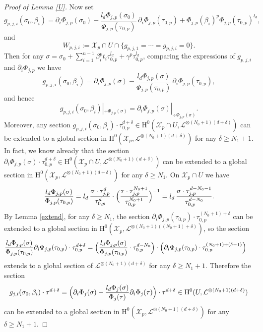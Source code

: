 \documentclass[JEP,XML,SOM,Unicode,published]{cedram}
\theoremstyle{plain}
\theoremstyle{definition}
\newcommand{\ho}{\mathrm{H}}
\newcommand{\X}{\mathcal{X}}
\newcommand{\li}{\mathcal{L}}
\begin{document}
\begin{proof}[Proof of Lemma \ref{U}]
Now set\vspace*{-3pt}
\[
g_{p, j,i}(\sigma_0,\beta_i)=\partial_i \Phi_{j,p}(\sigma_0)-\frac{l_d\Phi_{j,p}(\sigma_0)}{\Phi_{j,p}(\tau_{0,p})}\, \partial_i\Phi_{j,p}(\tau_{0,p})+\Phi_{j,p}(\beta_i)^p\Phi_{j,p}(\tau_{0,p})^{l_d},
\]
and\vspace*{-3pt}
\[
W_{p,j,i}:=\X_p\cap U\cap \{ g_{p,j,1}=\cdots=g_{p,j,i}=0 \}.
\]
Then for any $\sigma=\sigma_0+\sum_{i=1}^{n-1} \beta_i^pt_i\tau_{0,p}^{l_d}+\gamma^p\tau_{0,p}^{l_d}$, comparing the expressions of $g_{p,j,i}$ and $\partial_i\Phi_{j,p}$ we have\vspace*{-7pt}
\[
g_{p,j,i}(\sigma_0,\beta_i)=\partial_i\Phi_{j,p}(\sigma)-\frac{l_d\Phi_{j,p}(\sigma)}{\Phi_{j,p}(\tau_{0,p})}\,\partial_i\Phi_{j,p}(\tau_{0,p}),
\]
and hence\vspace*{-3pt}
\[
g_{p,j,i}(\sigma_0,\beta_i)|_{ \div \Phi_{j,p}(\sigma)}=\partial_i\Phi_{j,p}(\sigma)|_{ \div \Phi_{j,p}(\sigma)}.
\]
Moreover, any section $g_{p,j,i}(\sigma_0,\beta_i)\cdot \tau_{0,p}^{d+\delta}\in \ho^0(\X_p\cap U, \li^{\otimes (N_0+1)(d+\delta)})$ can be extended to a global section in $\ho^0(\X_p, \li^{\otimes (N_0+1)(d+\delta)})$ for any $\delta\geq N_1+1$. In fact, we know already that the section $\partial_i\Phi_{j,p}(\sigma)\cdot \tau_{0,p}^{d+\delta}\in \ho^0(\X_p\cap U, \li^{\otimes (N_0+1)(d+\delta)})$ can be extended to a global section in $\ho^0(\X_p, \li^{\otimes (N_0+1)(d+\delta)})$ for any $\delta\geq N_1$. On $\X_p\cap U$ we have
\[
\frac{l_d\Phi_{j,p}(\sigma)}{\Phi_{j,p}(\tau_{0,p})}= l_d\,\frac{\sigma \cdot \tau_{j,p}^d}{\tau_{0,p}^d} \cdot\Bigl(\frac{\tau \cdot \tau_{j,p}^{N_0+1}}{\tau_{0,p}^{N_0+1}}\Bigr)^{-1}=l_d\,\frac{\sigma \cdot \tau_{j,p}^{d-N_0-1}}{\tau_{0,p}^{d-N_0}}.
\]
By Lemma \ref{extend}, for any $\delta\geq N_1$, the section $ \partial_i\Phi_{j,p}(\tau_{0,p}) \cdot \tau_{0,p}^{(N_0+1)+\delta}$ can be extended to a global section in $\ho^0(\X_p, \li^{\otimes (N_0+1)((N_0+1)+\delta)})$, so the section
\begin{align*}
\frac{l_d\Phi_{j,p}(\sigma)}{\Phi_{j,p}(\tau_{0,p})} \partial_i\Phi_{j,p}(\tau_{0,p})\cdot \tau_{0,p}^{d+\delta} &= \Bigl(\frac{l_d\Phi_{j,p}(\sigma)}{\Phi_{j,p}(\tau_{0,p})}\cdot \tau_{0,p}^{d-N_0}\Bigr)\cdot \left(\partial_i\Phi_{j,p}(\tau_{0,p}) \cdot \tau_{0,p}^{(N_0+1)+(\delta-1)} \right)
\end{align*}
extends to a global section of $\li^{\otimes (N_0+1)(d+\delta)}$ for any $\delta \geq N_1+1$.
Therefore the section
\[
g_{j,i}(\sigma_0,\beta_i)\cdot \tau^{d+\delta}=\Bigl(\partial_i\Phi_{j}(\sigma)-\frac{l_d\Phi_j(\sigma)}{\Phi_j(\tau)}\partial_i\Phi_j(\tau)\Bigr)\cdot \tau^{d+\delta}\in \ho^0(U, \li^{\otimes (N_0+1)(d+\delta)})
\]
can be extended to a global section in $\ho^0(\X_p, \li^{\otimes (N_0+1)(d+\delta)})$ for any $\delta\geq N_1+1$.


\end{proof}
\end{document}
